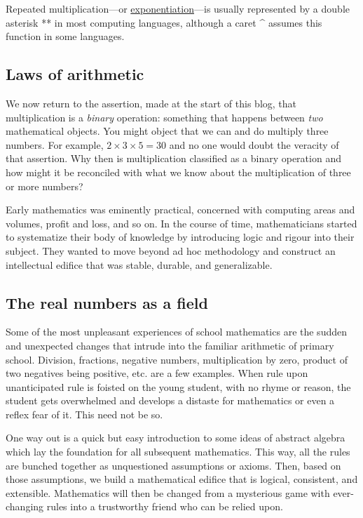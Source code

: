 \documentclass[
  a4paper,
]{article}
\begin{document}
Repeated multiplication---or
\protect\hyperlink{exponentiation}{exponentiation}---is usually
represented by a double asterisk ** in most computing languages,
although a caret \^{} assumes this function in some languages.

\hypertarget{laws-of-arithmetic}{%
\subsection{Laws of arithmetic}\label{laws-of-arithmetic}}

We now return to the assertion, made at the start of this blog, that
multiplication is a \emph{binary} operation: something that happens
between \emph{two} mathematical objects. You might object that we can
and do multiply three numbers. For example, \(2 \times 3 \times 5 = 30\)
and no one would doubt the veracity of that assertion. Why then is
multiplication classified as a binary operation and how might it be
reconciled with what we know about the multiplication of three or more
numbers?

Early mathematics was eminently practical, concerned with computing
areas and volumes, profit and loss, and so on. In the course of time,
mathematicians started to systematize their body of knowledge by
introducing logic and rigour into their subject. They wanted to move
beyond ad hoc methodology and construct an intellectual edifice that was
stable, durable, and generalizable.

\hypertarget{the-real-numbers-as-a-field}{%
\subsection{The real numbers as a
field}\label{the-real-numbers-as-a-field}}

Some of the most unpleasant experiences of school mathematics are the
sudden and unexpected changes that intrude into the familiar arithmetic
of primary school. Division, fractions, negative numbers, multiplication
by zero, product of two negatives being positive, etc. are a few
examples. When rule upon unanticipated rule is foisted on the young
student, with no rhyme or reason, the student gets overwhelmed and
develops a distaste for mathematics or even a reflex fear of it. This
need not be so.

One way out is a quick but easy introduction to some ideas of abstract
algebra which lay the foundation for all subsequent mathematics. This
way, all the rules are bunched together as unquestioned assumptions or
axioms. Then, based on those assumptions, we build a mathematical
edifice that is logical, consistent, and extensible. Mathematics will
then be changed from a mysterious game with ever-changing rules into a
trustworthy friend who can be relied upon.
\end{document}
